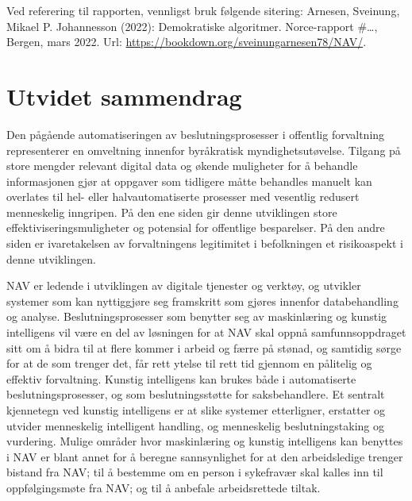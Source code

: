 \documentclass[
  12pt,
  a4paper, 12pt]{article}
\begin{document}
Ved referering til rapporten, vennligst bruk følgende sitering:
Arnesen, Sveinung, Mikael P. Johannesson (2022): Demokratiske algoritmer. Norce-rapport \#\ldots, Bergen, mars 2022. Url: \url{https://bookdown.org/sveinungarnesen78/NAV/}.

\newpage\singlespacing

\hypertarget{utvidet-sammendrag}{%
\section*{Utvidet sammendrag}\label{utvidet-sammendrag}}

Den pågående automatiseringen av beslutningsprosesser i offentlig forvaltning representerer en omveltning innenfor byråkratisk myndighetsutøvelse.
Tilgang på store mengder relevant digital data og økende muligheter for å behandle informasjonen gjør at oppgaver som tidligere måtte behandles manuelt kan overlates til hel- eller halvautomatiserte prosesser med vesentlig redusert menneskelig inngripen.
På den ene siden gir denne utviklingen store effektiviseringsmuligheter og potensial for offentlige besparelser.
På den andre siden er ivaretakelsen av forvaltningens legitimitet i befolkningen et risikoaspekt i denne utviklingen.

NAV er ledende i utviklingen av digitale tjenester og verktøy, og utvikler systemer som kan nyttiggjøre seg framskritt som gjøres innenfor databehandling og analyse.
Beslutningsprosesser som benytter seg av maskinlæring og kunstig intelligens vil være en del av løsningen for at NAV skal oppnå samfunnsoppdraget sitt om å bidra til at flere kommer i arbeid og færre på stønad, og samtidig sørge for at de som trenger det, får rett ytelse til rett tid gjennom en pålitelig og effektiv forvaltning.
Kunstig intelligens kan brukes både i automatiserte beslutningsprosesser, og som beslutningsstøtte for saksbehandlere.
Et sentralt kjennetegn ved kunstig intelligens er at slike systemer etterligner, erstatter og utvider menneskelig intelligent handling, og menneskelig beslutningstaking og vurdering.
Mulige områder hvor maskinlæring og kunstig intelligens kan benyttes i NAV er blant annet for å beregne sannsynlighet for at den arbeidsledige trenger bistand fra NAV; til å bestemme om en person i sykefravær skal kalles inn til oppfølgingsmøte fra NAV; og til å anbefale arbeidsrettede tiltak.
\end{document}
